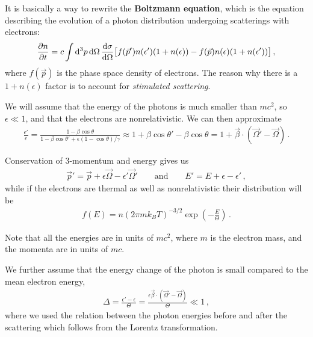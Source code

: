 \documentclass[main.tex]{subfiles}
\begin{document}
It is basically a way to rewrite the \textbf{Boltzmann equation}, which is the equation describing the evolution of a photon distribution undergoing scatterings with electrons: 
%
\begin{align}
\pdv{n}{t} = c \int \dd[3]{p} \dd{\Omega } \dv{\sigma }{\Omega } 
\qty[f(\vec{p}') n(\epsilon ') (1 + n(\epsilon )) - f(\vec{p}) n(\epsilon ) (1 + n(\epsilon '))]
\,,
\end{align}
%
where \(f(\vec{p})\) is the phase space density of electrons. 
The reason why there is a \(1 + n(\epsilon )\) factor is to account for \emph{stimulated scattering}.

We will assume that the energy of the photons is much smaller than \(mc^2\), so \(\epsilon \ll 1\), and that the electrons are nonrelativistic. We can then approximate 
%
\begin{align}
\frac{\epsilon'}{\epsilon } = \frac{1 - \beta \cos \theta }{1 - \beta \cos \theta ' + \epsilon (1 - \cos \theta ) / \gamma } \approx 1 + \beta \cos \theta ' - \beta \cos \theta = 1 + \vec{\beta} \cdot (\vec{\Omega}' - \vec{\Omega})
\,.
\end{align}

Conservation of 3-momentum and energy gives us 
%
\begin{align}
\vec{p}' = \vec{p} + \epsilon \vec{\Omega} - \epsilon ' \vec{\Omega}' 
\qquad \text{and} \qquad
E' = E + \epsilon - \epsilon '
\,,
\end{align}
%
while if the electrons are thermal as well as nonrelativistic their distribution will be 
%
\begin{align}
f(E) = n (2 \pi m k_B T)^{-3/2} \exp(- \frac{E}{\Theta }) 
\,.
\end{align}

Note that all the energies are in units of \(mc^2\), where \(m\) is the electron mass, and the momenta are in units of \(mc\). 

We further assume that the energy change of the photon is small compared to the mean electron energy, 
%
\begin{align}
\Delta = \frac{\epsilon ' - \epsilon }{\Theta } = \frac{\epsilon \vec{\beta} \cdot (\vec{\Omega}' - \vec{\Omega})}{\Theta } \ll 1 
\,,
\end{align}
%
where we used the relation between the photon energies before and after the scattering which follows from the Lorentz transformation. 
\end{document}
